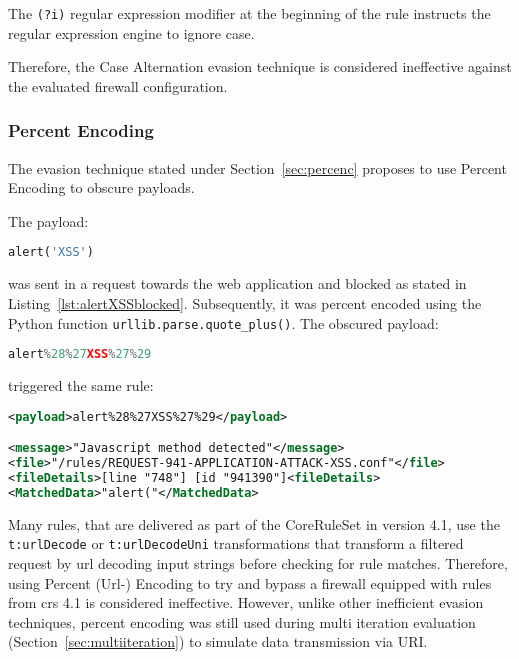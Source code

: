 The \verb|(?i)| regular expression modifier at the beginning of the rule instructs the regular expression engine to ignore case. \cite{regex/jan}

Therefore, the Case Alternation evasion technique is considered ineffective against the evaluated firewall configuration.


\subsubsection{Percent Encoding}
\label{sec:percencsingleiter}
The evasion technique stated under Section~\ref{sec:percenc} proposes to use Percent Encoding to obscure payloads.

The payload:

\begin{lstlisting}[style=basicStyle, language=Python]
alert('XSS')
\end{lstlisting}

was sent in a request towards the web application and blocked as stated in Listing~\ref{lst:alertXSSblocked}. Subsequently, it was percent encoded using the Python function \verb|urllib.parse.quote_plus()|. The obscured payload:

\begin{lstlisting}[style=basicStyle, language=Python]
alert%28%27XSS%27%29
\end{lstlisting}

triggered the same rule:

\begin{lstlisting}[style=ruleStyle, language=XML, caption=url encoded payload blocked, label={lst:urlencodedexampleblocked}]
<payload>alert%28%27XSS%27%29</payload>

<message>"Javascript method detected"</message>
<file>"/rules/REQUEST-941-APPLICATION-ATTACK-XSS.conf"</file>
<fileDetails>[line "748"] [id "941390"]<fileDetails>
<MatchedData>"alert("</MatchedData>
\end{lstlisting}

Many rules, that are delivered as part of the CoreRuleSet in version 4.1, use the \verb|t:urlDecode| or \verb|t:urlDecodeUni| transformations that transform a filtered request by url decoding input strings before checking for rule matches. Therefore, using Percent (Url-) Encoding to try and bypass a firewall equipped with rules from \acrshort{crs} 4.1 is considered ineffective. However, unlike other inefficient evasion techniques, percent encoding was still used during multi iteration evaluation (Section~\ref{sec:multiiteration}) to simulate data transmission via URI.  

